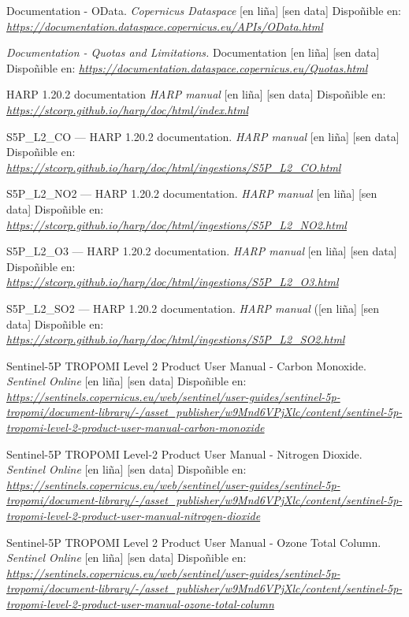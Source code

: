 \begin{thebibliography}{99}
     Documentation - OData. \textit{Copernicus Dataspace} [en liña] [sen data] Dispoñible en: \textit{\url{https://documentation.dataspace.copernicus.eu/APIs/OData.html}}

     \textit{Documentation - Quotas and Limitations.} Documentation [en liña] [sen data] Dispoñible en:  \textit{\url{https://documentation.dataspace.copernicus.eu/Quotas.html}}

     HARP 1.20.2 documentation \textit{HARP manual} [en liña] [sen data] Dispoñible en: \textit{\url{https://stcorp.github.io/harp/doc/html/index.html}}

     S5P\_L2\_CO — HARP 1.20.2 documentation. \textit{HARP manual} [en liña] [sen data] Dispoñible en: \textit{\url{https://stcorp.github.io/harp/doc/html/ingestions/S5P_L2_CO.html}}

     S5P\_L2\_NO2 — HARP 1.20.2 documentation. \textit{HARP manual} [en liña] [sen data] Dispoñible en: \textit{\url{https://stcorp.github.io/harp/doc/html/ingestions/S5P_L2_NO2.html}}

     S5P\_L2\_O3 — HARP 1.20.2 documentation. \textit{HARP manual} [en liña] [sen data] Dispoñible en: \textit{\url{https://stcorp.github.io/harp/doc/html/ingestions/S5P_L2_O3.html}}

     S5P\_L2\_SO2 — HARP 1.20.2 documentation. \textit{HARP manual} ([en liña] [sen data] Dispoñible en: \textit{\url{https://stcorp.github.io/harp/doc/html/ingestions/S5P_L2_SO2.html}}

     Sentinel-5P TROPOMI Level 2 Product User Manual - Carbon Monoxide. \textit{Sentinel Online} [en liña] [sen data] Dispoñible en: \textit{\url{https://sentinels.copernicus.eu/web/sentinel/user-guides/sentinel-5p-tropomi/document-library/-/asset_publisher/w9Mnd6VPjXlc/content/sentinel-5p-tropomi-level-2-product-user-manual-carbon-monoxide}}

     Sentinel-5P TROPOMI Level-2 Product User Manual - Nitrogen Dioxide. \textit{Sentinel Online} [en liña] [sen data] Dispoñible en: \textit{\url{https://sentinels.copernicus.eu/web/sentinel/user-guides/sentinel-5p-tropomi/document-library/-/asset_publisher/w9Mnd6VPjXlc/content/sentinel-5p-tropomi-level-2-product-user-manual-nitrogen-dioxide}}

     Sentinel-5P TROPOMI Level 2 Product User Manual - Ozone Total Column. \textit{Sentinel Online} [en liña] [sen data] Dispoñible en: \textit{\url{https://sentinels.copernicus.eu/web/sentinel/user-guides/sentinel-5p-tropomi/document-library/-/asset_publisher/w9Mnd6VPjXlc/content/sentinel-5p-tropomi-level-2-product-user-manual-ozone-total-column}}


\end{thebibliography}
